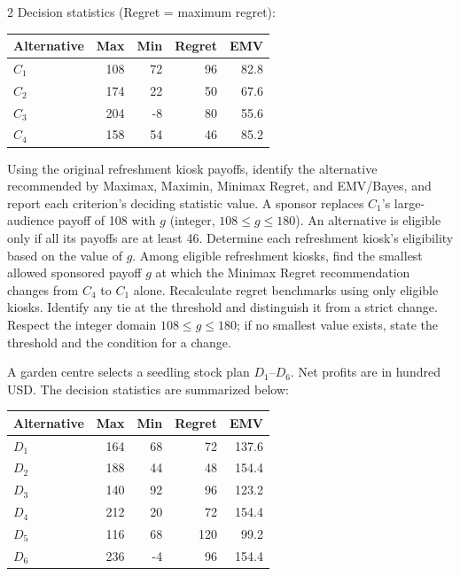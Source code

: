 \begin{multicols}{2}
Decision statistics (Regret = maximum regret):

\begin{center}\small\setlength{\tabcolsep}{4pt}
	\begin{tabular}{lrrrr}\toprule
		Alternative & Max & Min & Regret & EMV\\ \midrule
				$C_1$ & 108 & 72 & 96 & 82.8\\
		$C_2$ & 174 & 22 & 50 & 67.6\\
		$C_3$ & 204 & -8 & 80 & 55.6\\
		$C_4$ & 158 & 54 & 46 & 85.2\\
		\bottomrule
	\end{tabular}
\end{center}

\noindent Using the original refreshment kiosk payoffs, identify the alternative recommended by Maximax, Maximin, Minimax Regret, and EMV/Bayes, and report each criterion's deciding statistic value.  A sponsor replaces $C_1$'s large-audience payoff of 108 with $g$ (integer, $108\leq g\leq180$). An alternative is eligible only if all its payoffs are at least 46. Determine each refreshment kiosk's eligibility based on the value of $g$.  Among eligible refreshment kiosks, find the smallest allowed sponsored payoff $g$ at which the Minimax Regret recommendation changes from $C_4$ to $C_1$ alone. Recalculate regret benchmarks using only eligible kiosks. Identify any tie at the threshold and distinguish it from a strict change. Respect the integer domain $108\leq g\leq180$; if no smallest value exists, state the threshold and the condition for a change. 

A garden centre selects a seedling stock plan $D_1$--$D_6$. Net profits are in hundred USD. The decision statistics are summarized below:

\vspace{-3mm}
\begin{center}\small\setlength{\tabcolsep}{4pt}
	\begin{tabular}{lrrrr}\toprule
		Alternative & Max & Min & Regret & EMV\\ \midrule
		$D_1$ & 164 & 68 & 72 & 137.6\\
		$D_2$ & 188 & 44 & 48 & 154.4\\
		$D_3$ & 140 & 92 & 96 & 123.2\\
		$D_4$ & 212 & 20 & 72 & 154.4\\
		$D_5$ & 116 & 68 & 120 & 99.2\\
		$D_6$ & 236 & -4 & 96 & 154.4\\
		\bottomrule
	\end{tabular}
\end{center}
\vspace{-3mm}


\end{multicols}
